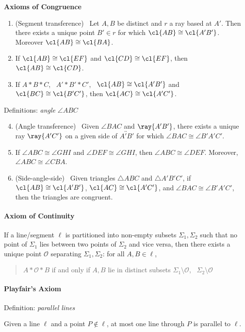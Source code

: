 \begin{minipage}[t]{0.48\linewidth}\vspace{0pt}
	\textbf{Axioms of Congruence}
	\begin{enumerate}
	  \item[C-1] (Segment transference) \ Let $A,B$ be distinct and $r$ a ray based at $A'$. Then there exists a unique point $B'\in r$ for which $\cl{AB}\cong\cl{A'B'}$. Moreover $\cl{AB}\cong\cl{BA}$.
	  \item[C-2] If $\cl{AB}\cong\cl{EF}$ and $\cl{CD}\cong\cl{EF}$, then $\cl{AB}\cong\cl{CD}$.
	  \item[C-3] If $A*B*C$, \ $A'*B'*C'$, \ $\cl{AB}\cong\cl{A'B'}$ and $\cl{BC}\cong\cl{B'C'}$, then $\cl{AC}\cong\cl{A'C'}$.
	\end{enumerate}
		
	Definitions: \emph{angle} $\angle ABC$\vspace{-2pt}
	
	\begin{enumerate}\setcounter{enumi}{3}
	  \item[C-4] (Angle transference) \ Given $\angle BAC$ and $\ray{A'B'}$, there exists a unique ray $\ray{A'C'}$ on a given side of $\overleftrightarrow{A'B'}$ for which $\angle BAC\cong\angle B'A'C'$.
	  \item[C-5] If $\angle ABC\cong\angle GHI$ and $\angle DEF\cong\angle GHI$, then $\angle ABC\cong\angle DEF$. Moreover, $\angle ABC\cong\angle CBA$.
	  \item[C-6] (Side-angle-side) \ Given triangles $\triangle ABC$ and $\triangle A'B'C'$, if $\cl{AB}\cong\cl{A'B'}$, $\cl{AC}\cong\cl{A'C'}$, and $\angle BAC\cong\angle B'A'C'$, then the triangles are congruent.\footnotemark{}
	\end{enumerate}
	
	
	\paragraph{Axiom of Continuity}\phantom{bob}\smallbreak
	
	If a line/segment $\ell$ is partitioned into non-empty subsets $\Sigma_1,\Sigma_2$ such that no point of $\Sigma_1$ lies between two points of $\Sigma_2$ and vice versa, then there exists a unique point $\mathcal O$ separating $\Sigma_1,\Sigma_2$:
	for all $A,B\in\ell$,
	\begin{quote}
		$A*\mathcal O*B$ if and only if $A,B$ lie in distinct subsets $\Sigma_1\setminus\mathcal O$, \ $\Sigma_2\setminus\mathcal O$%
	\end{quote}
	
	
	\paragraph{Playfair's Axiom}\phantom{bob}\smallbreak
	
	Definition: \emph{parallel lines}\smallbreak
	
	Given a line $\ell$ and a point $P\notin\ell$, at most one line through $P$ is parallel to $\ell$.
\end{minipage}


\clearpage

\onecolumn

